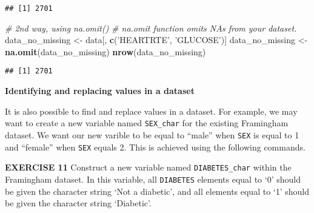 \documentclass[
]{article}
\newenvironment{Shaded}{\begin{snugshade}}{\end{snugshade}}
\newcommand{\CommentTok}[1]{\textcolor[rgb]{0.56,0.35,0.01}{\textit{#1}}}
\newcommand{\DecValTok}[1]{\textcolor[rgb]{0.00,0.00,0.81}{#1}}
\newcommand{\KeywordTok}[1]{\textcolor[rgb]{0.13,0.29,0.53}{\textbf{#1}}}
\newcommand{\NormalTok}[1]{#1}
\newcommand{\OperatorTok}[1]{\textcolor[rgb]{0.81,0.36,0.00}{\textbf{#1}}}
\newcommand{\StringTok}[1]{\textcolor[rgb]{0.31,0.60,0.02}{#1}}
\begin{document}
\begin{verbatim}
## [1] 2701
\end{verbatim}

\begin{Shaded}
\begin{Highlighting}[]
\CommentTok{# 2nd way, using na.omit()}
\CommentTok{# na.omit function omits NAs from your dataset.}
\NormalTok{data_no_missing <-}\StringTok{ }\NormalTok{data[, }\KeywordTok{c}\NormalTok{(}\StringTok{'HEARTRTE'}\NormalTok{, }\StringTok{'GLUCOSE'}\NormalTok{)]}
\NormalTok{data_no_missing <-}\StringTok{ }\KeywordTok{na.omit}\NormalTok{(data_no_missing)}
\KeywordTok{nrow}\NormalTok{(data_no_missing)}
\end{Highlighting}
\end{Shaded}

\begin{verbatim}
## [1] 2701
\end{verbatim}

\textbf{Identifying and replacing values in a dataset}

It is also possible to find and replace values in a dataset. For
example, we may want to create a new variable named \texttt{SEX\_char}
for the existing Framingham dataset. We want our new varible to be equal
to ``male'' when \texttt{SEX} is equal to 1 and ``female'' when
\texttt{SEX} equals 2. This is achieved using the following commands.

\begin{Shaded}
\end{Shaded}

\textbf{EXERCISE 11} Construct a new variable named
\texttt{DIABETES\_char} within the Framingham dataset. In this variable,
all \texttt{DIABETES} elements equal to `0' should be given the
character string `Not a diabetic', and all elements equal to `1' should
be given the character string `Diabetic'.

\begin{Shaded}
\end{Shaded}
\end{document}
